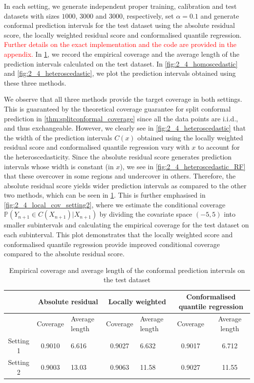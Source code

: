 \documentclass[11pt, titlepage]{article} %
\newcommand{\Prob}[1]{\mathbb{P}\left( #1 \right)}
\numberwithin{equation}{section}
\theoremstyle{definition}
\numberwithin{theorem}{section}
\numberwithin{lemma}{section}
\numberwithin{corollary}{section}
\numberwithin{proposition}{section}
\numberwithin{definition}{section}
\numberwithin{remark}{section}
\begin{document}
\noindent
In each setting, we generate independent proper training, calibration and test datasets with sizes \(1000\), \(3000\) and \(3000\), respectively, set \(\alpha = 0.1\) and generate conformal prediction intervals for the test dataset using the absolute residual score, the locally weighted residual score and conformalised quantile regression. \textcolor{red}{Further details on the exact implementation and the code are provided in the appendix.} In \cref{tab:2_4_settings1_2_results}, we record the empirical coverage and the average length of the prediction intervals calculated on the test dataset. In \cref{fig:2_4_homoscedastic} and \cref{fig:2_4_heteroscedastic}, we plot the prediction intervals obtained using these three methods. \vskip5pt

\noindent
We observe that all three methods provide the target coverage in both settings. This is guaranteed by the theoretical coverage guarantee for split conformal prediction in \cref{thm:splitconformal_coverage} since all the data points are i.i.d., and thus exchangeable. However, we clearly see in \cref{fig:2_4_heteroscedastic} that the width of the prediction intervals \(C(x)\) obtained using the locally weighted residual score and conformalised quantile regression vary with \(x\) to account for the heteroscedasticity. Since the absolute residual score generates prediction intervals whose width is constant (in \(x\)), we see in \cref{fig:2_4_heteroscedastic_RF} that these overcover in some regions and undercover in others. Therefore, the absolute residual score yields wider prediction intervals as compared to the other two methods, which can be seen in \cref{tab:2_4_settings1_2_results}. This is further emphasised in \cref{fig:2_4_local_cov_setting2}, where we estimate the conditional coverage \(\Prob{Y_{n+1} \in C(X_{n+1} ) | X_{n+1}}\) by dividing the covariate space \((-5,5)\) into smaller subintervals and calculating the empirical coverage for the test dataset on each subinterval. This plot demonstrates that the locally weighted score and conformalised quantile regression provide improved conditional coverage compared to the absolute residual score.

\begin{table}[h]
    \centering
    \renewcommand{\arraystretch}{1.2}
    \begin{tabular}{|c|c|p{1.5cm}|c|p{1.5cm}|c|c|}
        \hline
        & \multicolumn{2}{c|}{Absolute residual} & \multicolumn{2}{c|}{Locally weighted} & \multicolumn{2}{c|}{Conformalised quantile regression} \\
        \hline
        & Coverage & Average length & Coverage & Average length & Coverage & Average length \\
        \hline
        Setting 1 & 0.9010 & 6.616 & 0.9027 & 6.632 & 0.9017 & 6.712 \\
        Setting 2 & 0.9003 & 13.03 & 0.9063 & 11.58 & 0.9027 & 11.55 \\
        \hline
    \end{tabular}
    \caption{Empirical coverage and average length of the conformal prediction intervals on the test dataset}
    \label{tab:2_4_settings1_2_results}
\end{table}
\end{document}
